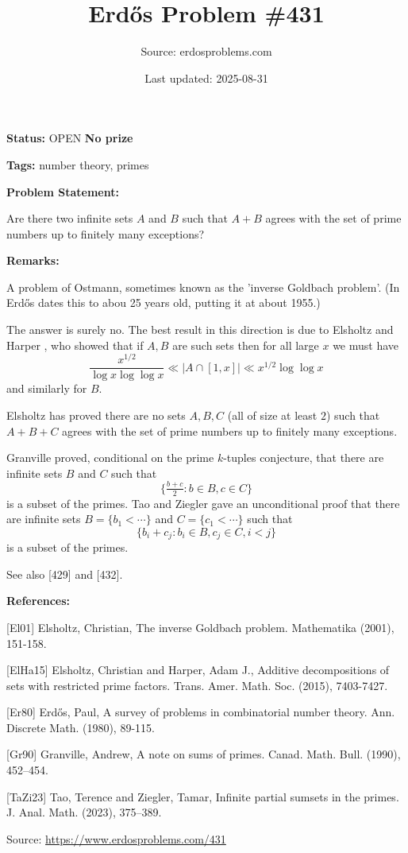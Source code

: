 \documentclass{article}
\title{Erd\H{o}s Problem \#431}
\date{Last updated: 2025-08-31}
\author{Source: erdosproblems.com}
\begin{document}
\maketitle

\noindent\textbf{Status:} OPEN \quad \textbf{No prize}

\noindent\textbf{Tags:} number theory, primes

\medskip
\noindent\textbf{Problem Statement:}

Are there two infinite sets $A$ and $B$ such that $A+B$ agrees with the set of prime numbers up to finitely many exceptions?

\bigskip
\noindent\textbf{Remarks:}

A problem of Ostmann, sometimes known as the 'inverse Goldbach problem'. (In \cite{Er80} Erd\H{o}s dates this to abou 25 years old, putting it at about 1955.)

The answer is surely no. The best result in this direction is due to Elsholtz and Harper \cite{ElHa15}, who showed that if $A,B$ are such sets then for all large $x$ we must have\[\frac{x^{1/2}}{\log x\log\log x} \ll \lvert A \cap [1,x]\rvert \ll x^{1/2}\log\log x\]and similarly for $B$.

Elsholtz \cite{El01} has proved there are no sets $A,B,C$ (all of size at least $2$) such that $A+B+C$ agrees with the set of prime numbers up to finitely many exceptions.

Granville \cite{Gr90} proved, conditional on the prime $k$-tuples conjecture, that there are infinite sets $B$ and $C$ such that\[\{ \tfrac{b+c}{2}: b\in B, c\in C\}\]is a subset of the primes. Tao and Ziegler \cite{TaZi23} gave an unconditional proof that there are infinite sets $B=\{b_1<\cdots\}$ and $C=\{c_1<\cdots\}$ such that\[\{ b_i+c_j : b_i\in B, c_j\in C, i<j\}\]is a subset of the primes.

See also [429] and [432].

\bigskip
\noindent\textbf{References:}

[El01] Elsholtz, Christian, The inverse Goldbach problem. Mathematika (2001), 151-158.
 
 [ElHa15] Elsholtz, Christian and Harper, Adam J., Additive decompositions of sets with restricted prime factors. Trans. Amer. Math. Soc. (2015), 7403-7427.
 
 [Er80] Erd\H{o}s, Paul, A survey of problems in combinatorial number theory. Ann. Discrete Math. (1980), 89-115.
 
 [Gr90] Granville, Andrew, A note on sums of primes. Canad. Math. Bull. (1990), 452--454.
 
 [TaZi23] Tao, Terence and Ziegler, Tamar, Infinite partial sumsets in the primes. J. Anal. Math. (2023), 375--389.

\bigskip
\noindent\small{Source: \url{https://www.erdosproblems.com/431}}
\end{document}

